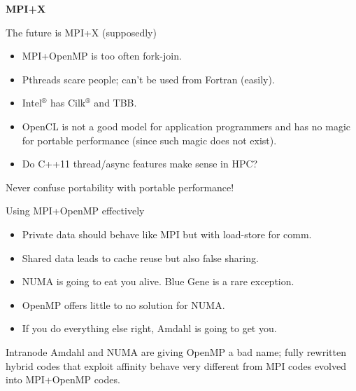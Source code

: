 \documentclass[11pt]{beamer}
\begin{document}
\begin{frame}{} \LARGE
  \begin{center}
      \textbf{MPI+X}
  \end{center}
\end{frame}

\begin{frame}[fragile]{The future is MPI+X (supposedly)} \large
\begin{itemize}
	\item MPI+OpenMP is too often fork-join.
	\item Pthreads scare people; can't be used from Fortran (easily).
	\item Intel$^\circledR$ has Cilk$^\circledR$ and TBB.
	\item OpenCL is not a good model for application programmers
          and has no magic for portable performance (since such magic does not exist).
    \item Do C++11 thread/async features make sense in HPC?
\end{itemize}
Never confuse portability with portable performance!
\end{frame}

\begin{frame}{Using MPI+OpenMP effectively} \large 
\begin{itemize}
	\item Private data should behave like MPI but with load-store for comm.
	\item Shared data leads to cache reuse but also false sharing.
	\item NUMA is going to eat you alive.  Blue Gene is a rare exception.
	\item OpenMP offers little to no solution for NUMA.
	\item If you do everything else right, Amdahl is going to get you.
\end{itemize}
Intranode Amdahl and NUMA are giving OpenMP a bad name;
fully rewritten hybrid codes that exploit affinity behave very different
from MPI codes evolved into MPI+OpenMP codes.
\end{frame}
\end{document}

